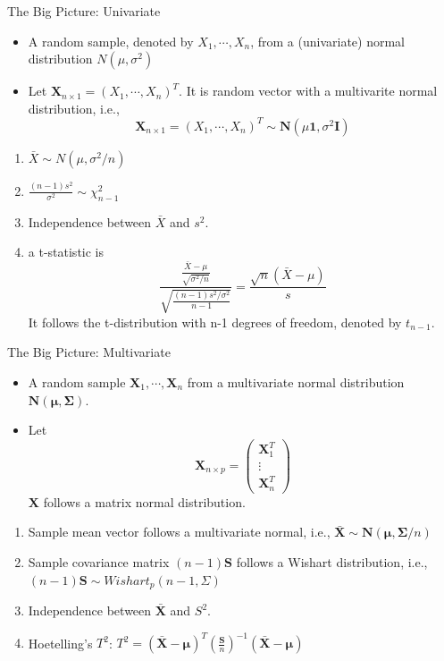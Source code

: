 \documentclass[
  ignorenonframetext,
]{beamer}
\providecommand{\tightlist}{%
  \setlength{\itemsep}{0pt}\setlength{\parskip}{0pt}}
\begin{document}
\begin{frame}{The Big Picture: Univariate}
\protect\hypertarget{the-big-picture-univariate}{}
\begin{itemize}
\tightlist
\item
  A random sample, denoted by \(X_1, \cdots, X_n\), from a (univariate)
  normal distribution \(N(\mu, \sigma^2)\)
\item
  Let \(\mathbf X_{n\times 1}=(X_1, \cdots, X_n)^T\). It is random
  vector with a multivarite normal distribution, i.e.,
  \[\mathbf X_{n\times 1}=(X_1, \cdots, X_n)^T \sim \mathbf N(\mu\mathbf 1, \sigma^2\mathbf I)\]
\end{itemize}

\begin{enumerate}
\tightlist
\item
  \(\bar X \sim N(\mu, \sigma^2/n)\)
\item
  \(\frac{(n-1)s^2}{\sigma^2} \sim \chi_{n-1}^2\)
\item
  Independence between \(\bar X\) and \(s^2\).
\item
  a t-statistic is
  \[\frac{\frac{\bar X-\mu}{\sqrt{\sigma^2/n}}}{\sqrt{\frac{(n-1)s^2/\sigma^2}{n-1}}}=\frac{\sqrt{n}(\bar X-\mu)}{s}\]
  It follows the t-distribution with n-1 degrees of freedom, denoted by
  \(t_{n-1}\).
\end{enumerate}
\end{frame}

\begin{frame}{The Big Picture: Multivariate}
\protect\hypertarget{the-big-picture-multivariate}{}
\begin{itemize}
\tightlist
\item
  A random sample \(\mathbf X_1, \cdots, \mathbf X_n\) from a
  multivariate normal distribution
  \(\mathbf N(\boldsymbol \mu, \boldsymbol \Sigma)\).
\item
  Let \[\mathbf X_{n\times p}=\begin{pmatrix}
  \mathbf X_1^T \\ \vdots \\\mathbf X_n^T
  \end{pmatrix}\] \(\mathbf X\) follows a matrix normal distribution.
\end{itemize}

\begin{enumerate}
\item
  Sample mean vector follows a multivariate normal, i.e.,
  \(\bar{\mathbf X} \sim \mathbf N(\boldsymbol \mu, \boldsymbol \Sigma/n)\)
\item
  Sample covariance matrix \((n-1)\mathbf S\) follows a Wishart
  distribution, i.e., \((n-1)\mathbf S \sim Wishart_p (n-1, \Sigma)\)
\item
  Independence between \(\bar {\mathbf X}\) and \(S^2\).
\item
  Hoetelling's \(T^2\):
  \(T^2 = (\bar{\mathbf X} - \boldsymbol \mu)^T\left(\frac{\mathbf S}{n}\right)^{-1} (\bar{\mathbf X} - \boldsymbol \mu)\)
\end{enumerate}
\end{frame}
\end{document}
